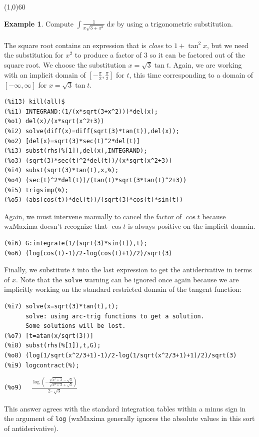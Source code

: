 \documentclass[10.5pt,twoside]{report}
\theoremstyle{definition}
\newtheorem{exmp}{Example}[section]
\begin{document}
\line(1,0){60}
\linethickness{0.5mm}

\begin{exmp} Compute $\displaystyle \int \frac{1}{x\sqrt{3+x^2}}\ \mathrm{d}x$ by using a trigonometric substitution.\\
${}$\\

The square root contains an expression that is \textit{close} to $1+\tan^2{x}$, but we need the substitution for $x^2$ to produce a factor of $3$ so it can be factored out of the square root. We choose the substitution $x=\sqrt{3} \tan{t}$.  Again, we are working with an implicit domain of $[-\frac{\pi}{2},\frac{\pi}{2}]$ for $t$, this time corresponding to a domain of $[-\infty,\infty]$ for $x=\sqrt{3} \tan{t}$.

\begin{verbatim}
(%i13) kill(all)$
(%i1) INTEGRAND:(1/(x*sqrt(3+x^2)))*del(x);
(%o1) del(x)/(x*sqrt(x^2+3))
(%i2) solve(diff(x)=diff(sqrt(3)*tan(t)),del(x));
(%o2) [del(x)=sqrt(3)*sec(t)^2*del(t)]
(%i3) subst(rhs(%[1]),del(x),INTEGRAND);
(%o3) (sqrt(3)*sec(t)^2*del(t))/(x*sqrt(x^2+3))
(%i4) subst(sqrt(3)*tan(t),x,%);
(%o4) (sec(t)^2*del(t))/(tan(t)*sqrt(3*tan(t)^2+3))
(%i5) trigsimp(%);
(%o5) (abs(cos(t))*del(t))/(sqrt(3)*cos(t)*sin(t))
\end{verbatim}

Again, we must intervene manually to cancel the factor of $\cos{t}$ because wxMaxima doesn't recognize that $\cos{t}$ is always positive on the implicit domain.\\

\begin{verbatim}
(%i6) G:integrate(1/(sqrt(3)*sin(t)),t);
(%o6) (log(cos(t)-1)/2-log(cos(t)+1)/2)/sqrt(3)    
\end{verbatim}

Finally, we substitute $t$ into the last expression to get the antiderivative in terms of $x$.  Note  that the \verb|solve| warning can be ignored once again because we are implicitly working on the standard restricted domain of the tangent function:\\

\begin{verbatim}
(%i7) solve(x=sqrt(3)*tan(t),t);
      solve: using arc-trig functions to get a solution.
      Some solutions will be lost.
(%o7) [t=atan(x/sqrt(3))]
(%i8) subst(rhs(%[1]),t,G);
(%o8) (log(1/sqrt(x^2/3+1)-1)/2-log(1/sqrt(x^2/3+1)+1)/2)/sqrt(3)
(%i9) logcontract(%);
\end{verbatim}

\verb|(%o9)  | $\displaystyle \frac{\log \left( -\frac{\sqrt{x^2+3}-\sqrt{3}}{\sqrt{x^2+3}+\sqrt{3}}\right)} {2\cdot \sqrt{3}}$\\
${}$\\
This answer agrees with the standard integration tables within a minus sign in the argument of \verb|log| (wxMaxima generally ignores the absolute values in this sort of antiderivative).

\end{exmp}
\end{document}

